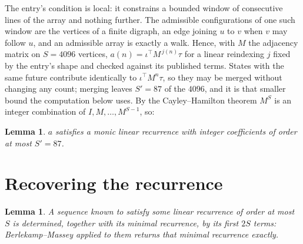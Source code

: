 \documentclass[11pt,a4paper]{article}
\theoremstyle{plain}
\newtheorem{lemma}[theorem]{Lemma}
\theoremstyle{definition}
\begin{document}
The entry's condition is local: it constrains a bounded window of consecutive lines of the
array and nothing further. The admissible configurations of one such window are the vertices
of a finite digraph, an edge joining $u$ to $v$ when $v$ may follow $u$, and an admissible
array is exactly a walk. Hence, with $M$ the adjacency matrix on $S=4096$ vertices,
$a(n)=\iota^{\!\top}M^{\,j(n)}\tau$ for a linear reindexing $j$ fixed by the entry's shape
and checked against its published terms. States with the same future contribute identically to $\iota^{\!\top}M^n\tau$, so they may be merged without changing any count; merging leaves $S'=87$ of the $4096$, and it is that smaller bound the computation below uses. By the Cayley--Hamilton theorem $M^{S}$ is an
integer combination of $I,M,\dots,M^{S-1}$, so:

\begin{lemma}\label{lem:cf}
$a$ satisfies a monic linear recurrence with integer coefficients of order at most
$S'=87$.
\end{lemma}

\section{Recovering the recurrence}

\begin{lemma}\label{lem:bm}
A sequence known to satisfy some linear recurrence of order at most $S$ is determined, together
with its minimal recurrence, by its first $2S$ terms: Berlekamp--Massey applied to them returns
that minimal recurrence exactly.
\end{lemma}
\end{document}
